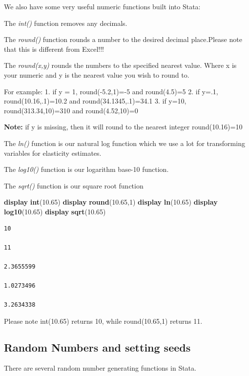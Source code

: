 \documentclass[
]{book}
\newenvironment{Shaded}{\begin{snugshade}}{\end{snugshade}}
\newcommand{\FunctionTok}[1]{\textcolor[rgb]{0.13,0.29,0.53}{\textbf{#1}}}
\newcommand{\KeywordTok}[1]{\textcolor[rgb]{0.13,0.29,0.53}{\textbf{#1}}}
\newcommand{\NormalTok}[1]{#1}
\begin{document}
We also have some very useful numeric functions built into Stata:

The \emph{int()} function removes any decimals.

The \emph{round()} function rounds a number to the desired decimal place.Please note that this is different from Excel!!!

The \emph{round(x,y)} rounds the numbers to the specified nearest value. Where x is your numeric and y is the nearest value you wish to round to.

For example:
1. if y = 1, round(-5.2,1)=-5 and round(4.5)=5
2. if y=.1, round(10.16,.1)=10.2 and round(34.1345,.1)=34.1
3. if y=10, round(313.34,10)=310 and round(4.52,10)=0

\textbf{Note:} if y is missing, then it will round to the nearest integer round(10.16)=10

The \emph{ln()} function is our natural log function which we use a lot for transforming variables for elasticity estimates.

The \emph{log10()} function is our logarithm base-10 function.

The \emph{sqrt()} function is our square root function

\begin{Shaded}
\begin{Highlighting}[]
    \KeywordTok{display} \KeywordTok{int}\NormalTok{(10.65)}
    \KeywordTok{display} \FunctionTok{round}\NormalTok{(10.65,1)}
    \KeywordTok{display} \FunctionTok{ln}\NormalTok{(10.65)}
    \KeywordTok{display} \FunctionTok{log10}\NormalTok{(10.65)}
    \KeywordTok{display} \FunctionTok{sqrt}\NormalTok{(10.65)}
\end{Highlighting}
\end{Shaded}

\begin{verbatim}
10

11

2.3655599

1.0273496

3.2634338
\end{verbatim}

Please note int(10.65) returns 10, while round(10.65,1) returns 11.

\subsection{Random Numbers and setting seeds}\label{random-numbers-and-setting-seeds}

There are several random number generating functions in Stata.
\end{document}
